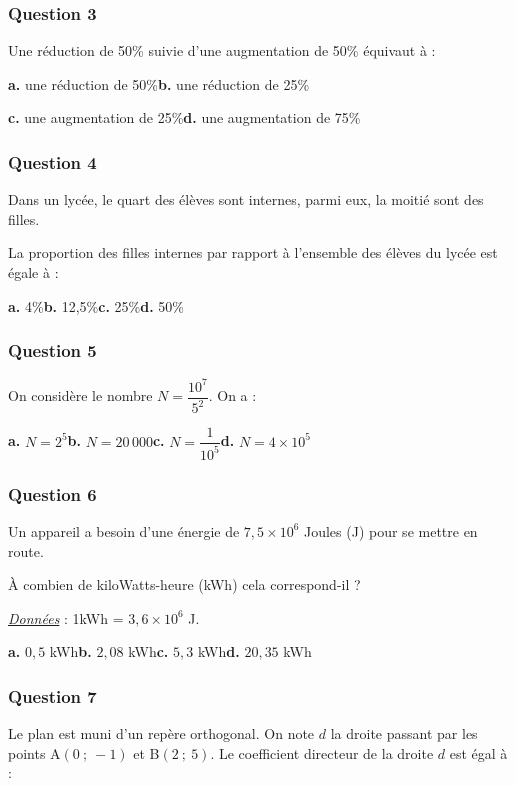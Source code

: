 \documentclass[10pt]{article}
\begin{document}
\subsubsection*{Question 3}
Une réduction de 50\% suivie d'une augmentation de 50\% équivaut à :

\textbf{a.} une réduction de 50\%\hfill \textbf{b.} une réduction de 25\%

\textbf{c.} une augmentation de 25\%\hfill \textbf{d.} une augmentation de 75\%

\subsubsection*{Question 4}
Dans un lycée, le quart des élèves sont internes, parmi eux, la moitié sont des filles.

La proportion des filles internes par rapport à l'ensemble des élèves du lycée est égale à :

\textbf{a.} 4\%\hfill \textbf{b.} 12,5\%\hfill \textbf{c.} 25\%\hfill \textbf{d.} 50\%

\subsubsection*{Question 5}
On considère le nombre $N = \dfrac{10^7}{5^2}$. On a :

\textbf{a.} $N = 2^5$\hfill \textbf{b.} $N = 20\,000$\hfill \textbf{c.} $N = \dfrac{1}{10^5}$\hfill \textbf{d.} $N = 4 \times 10^5$

\subsubsection*{Question 6}
Un appareil a besoin d'une énergie de $7,5 \times 10^6$ Joules (J) pour se mettre en route.

À combien de kiloWatts-heure (kWh) cela correspond-il ?

\begin{flushright}
\uline{\textit{Données}} : 1kWh = $3,6 \times 10^6$ J.
\end{flushright}

\textbf{a.} $0,5$ kWh\hfill \textbf{b.} $2,08$ kWh\hfill \textbf{c.} $5,3$ kWh\hfill \textbf{d.} $20,35$ kWh

\subsubsection*{Question 7}
Le plan est muni d'un repère orthogonal. On note $d$ la droite passant par les points A$(0~;~-1)$ et B$(2~;~5)$. Le coefficient directeur de la droite $d$ est égal à :
\end{document}
